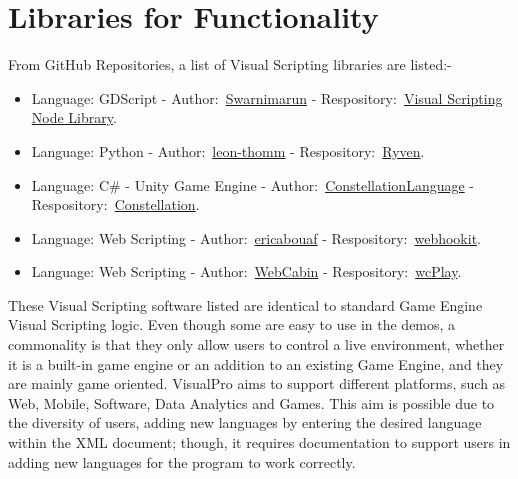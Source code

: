 \documentclass[12pt]{report} %
\begin{document}
	\section{Libraries for Functionality}
		From GitHub Repositories, a list of Visual Scripting libraries are listed:-
		\begin{itemize}
		\item Language: GDScript - Author:~\href{https://github.com/swarnimarun}{Swarnimarun} - Respository:~\href{https://github.com/swarnimarun/visual-scripting-node-library}{Visual Scripting Node Library}.
		\item Language: Python - Author:~\href{https://github.com/leon-thomm}{leon-thomm} - Respository:~\href{https://github.com/leon-thomm/Ryven}{Ryven}.
		\item Language: C\# - Unity Game Engine - Author:~\href{https://github.com/ConstellationLanguage}{ConstellationLanguage} - Respository:~\href{https://github.com/ConstellationLanguage/Constellation}{Constellation}.
		\item Language: Web Scripting - Author:~\href{https://github.com/ericabouaf}{ericabouaf} - Respository:~\href{https://github.com/ericabouaf/webhookit}{webhookit}.
		\item Language: Web Scripting - Author:~\href{https://github.com/WebCabin}{WebCabin} - Respository:~\href{https://github.com/WebCabin/wcPlay}{wcPlay}.
		\end{itemize}

		These Visual Scripting software listed are identical to standard Game Engine Visual Scripting logic. Even though some are easy to use in the demos, a commonality is that they only allow users to control a live environment, whether it is a built-in game engine or an addition to an existing Game Engine, and they are mainly game oriented. VisualPro aims to support different platforms, such as Web, Mobile, Software, Data Analytics and Games. This aim is possible due to the diversity of users, adding new languages by entering the desired language within the XML document; though, it requires documentation to support users in adding new languages for the program to work correctly.
\end{document}
